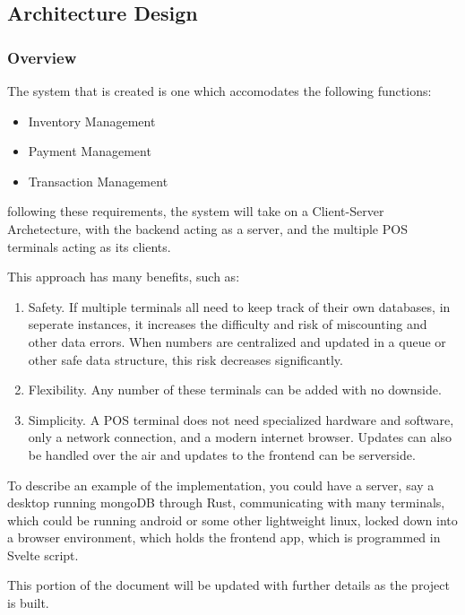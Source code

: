 \subsection{Architecture Design}


\subsubsection{Overview}
The system that is created is one which accomodates the following functions:
\begin{itemize}
  \item Inventory Management
  \item Payment Management
  \item Transaction Management
\end{itemize}

following these requirements, the system will take on a Client-Server Archetecture, with
the backend acting as a server, and the multiple POS terminals acting as its clients.\par
This approach has many benefits, such as:


\begin{enumerate}
\item Safety. If multiple terminals all need to keep track of their own databases, in
seperate instances, it increases the difficulty and risk of miscounting and other data errors.
When numbers are centralized and updated in a queue or other safe data structure, this
risk decreases significantly.
\item Flexibility. Any number of these terminals can be added with no downside.
\item Simplicity. A POS terminal does not need specialized hardware and software, only a network
connection, and a modern internet browser. Updates can also be handled over the air and updates 
to the frontend can be serverside.
\end{enumerate}

To describe an example of the implementation, you could have a server, say a desktop running
mongoDB through Rust, communicating with many terminals, which could be running android or some
other lightweight linux, locked down into a browser environment, which holds the frontend app, 
which is programmed in Svelte script.\par
This portion of the document will be updated with further details as the project is built.

